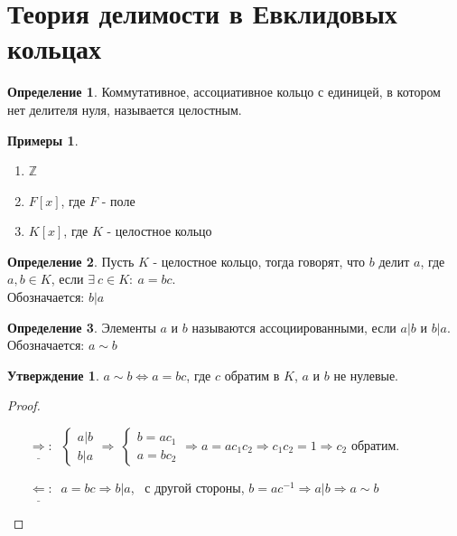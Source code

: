 \documentclass[a4paper, 12pt]{article}
\newcommand{\Z}{\mathbb Z}
\newcommand\tab[1][.5cm]{\hspace*{#1}}
\theoremstyle{definition}
\newtheorem*{definition}{Определение}
\newtheorem*{subtheorem}{Утверждение}
\newtheorem*{example}{Примеры}
\begin{document}
  \section{Теория делимости в Евклидовых кольцах}
  \begin{definition}
    Коммутативное, ассоциативное кольцо с единицей, в котором нет делителя нуля, называется целостным.
  \end{definition}
  \begin{example}\tab
    \begin{enumerate}
      \item $\Z$
      \item $F[x]$, где $F$ - поле
      \item $K[x]$, где $K$ - целостное кольцо     
    \end{enumerate}
  \end{example}
  \begin{definition}
    Пусть $K$ - целостное кольцо, тогда говорят, что $b$ делит $a$, где $a,b \in K$, если $\exists \ c \in K: \ a = bc$.\\
    Обозначается: $b|a$ 
  \end{definition}
  \begin{definition}
    Элементы $a$ и $b$ называются ассоциированными, если $a|b$ и $b|a$.\\
    Обозначается: $a \sim  b$ 
  \end{definition}
  \begin{subtheorem}
    $a\sim b \Longleftrightarrow a = bc$, где $c$ обратим в $K$, $a$ и $b$ не нулевые.   
  \end{subtheorem}
  \begin{proof}\tab
    \begin{itemize}
      \item[$\underline{\Longrightarrow }: \ $] $\begin{cases}
        a|b\\
        b|a
      \end{cases} \Longrightarrow \ \begin{cases}
        b = ac_1\\
        a = bc_2
      \end{cases} \Longrightarrow a = ac_1c_2 \Longrightarrow c_1c_2 =1 \Longrightarrow c_2$ обратим.
      \item[$\underline{\Longleftarrow}: \ $] $a=bc \Longrightarrow b|a$, \ с другой стороны, $b = ac^{-1} \Longrightarrow  a|b \Longrightarrow a \sim b$ 
    \end{itemize}
  \end{proof}
\end{document}
